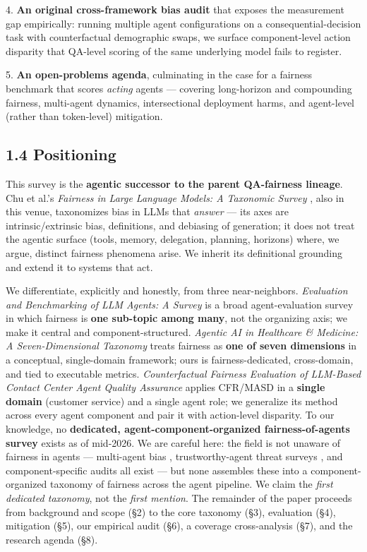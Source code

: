\documentclass[sigconf,nonacm]{acmart}
\begin{document}
4. \textbf{An original cross-framework bias audit} that exposes the measurement gap empirically: running multiple agent configurations on a consequential-decision task with counterfactual demographic swaps, we surface component-level action disparity that QA-level scoring of the same underlying model fails to register.

5. \textbf{An open-problems agenda}, culminating in the case for a fairness benchmark that scores \emph{acting} agents — covering long-horizon and compounding fairness, multi-agent dynamics, intersectional deployment harms, and agent-level (rather than token-level) mitigation.

\subsection{1.4 Positioning}

This survey is the \textbf{agentic successor to the parent QA-fairness lineage}. Chu et al.'s \emph{Fairness in Large Language Models: A Taxonomic Survey} \cite{chu2024fairness}, also in this venue, taxonomizes bias in LLMs that \emph{answer} — its axes are intrinsic/extrinsic bias, definitions, and debiasing of generation; it does not treat the agentic surface (tools, memory, delegation, planning, horizons) where, we argue, distinct fairness phenomena arise. We inherit its definitional grounding \cite{dwork2012fairness, hardt2016equality, kusner2017counterfactual, gallegos2024bias} and extend it to systems that act.

We differentiate, explicitly and honestly, from three near-neighbors. \emph{Evaluation and Benchmarking of LLM Agents: A Survey} \cite{mohammadi2025evaluation} is a broad agent-evaluation survey in which fairness is \textbf{one sub-topic among many}, not the organizing axis; we make it central and component-structured. \emph{Agentic AI in Healthcare & Medicine: A Seven-Dimensional Taxonomy} \cite{vatsal2026agentic} treats fairness as \textbf{one of seven dimensions} in a conceptual, single-domain framework; ours is fairness-dedicated, cross-domain, and tied to executable metrics. \emph{Counterfactual Fairness Evaluation of LLM-Based Contact Center Agent Quality Assurance} \cite{mayilvaghanan2026counterfactual} applies CFR/MASD in a \textbf{single domain} (customer service) and a single agent role; we generalize its method across every agent component and pair it with action-level disparity. To our knowledge, no \textbf{dedicated, agent-component-organized fairness-of-agents survey} exists as of mid-2026. We are careful here: the field is not unaware of fairness in agents — multi-agent bias \cite{borah2024implicit, madigan2025emergent}, trustworthy-agent threat surveys \cite{yu2025survey}, and component-specific audits \cite{blankenstein2025biasbusters, wu2024rag} all exist — but none assembles these into a component-organized taxonomy of fairness across the agent pipeline. We claim the \emph{first dedicated taxonomy}, not the \emph{first mention}. The remainder of the paper proceeds from background and scope (§2) to the core taxonomy (§3), evaluation (§4), mitigation (§5), our empirical audit (§6), a coverage cross-analysis (§7), and the research agenda (§8).
\end{document}
